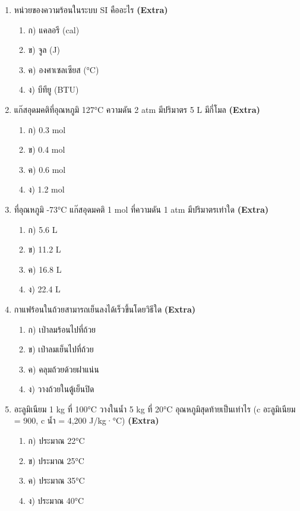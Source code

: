 \documentclass[12pt]{article}
\begin{document}
\begin{enumerate}[label=\arabic*.]
\begin{enumerate}[label=)]
\item ง) กระดาษดูดซับความร้อนไว้หมด
\end{enumerate}
\item หน่วยของความร้อนในระบบ SI คืออะไร \hfill \textbf{\small (Extra)}
\begin{enumerate}[label=)]
\item ก) แคลอรี (cal)
\item ข) จูล (J)
\item ค) องศาเซลเซียส (°C)
\item ง) บีทียู (BTU)
\end{enumerate}
\item แก๊สอุดมคติที่อุณหภูมิ 127°C ความดัน 2 atm มีปริมาตร 5 L มีกี่โมล \hfill \textbf{\small (Extra)}
\begin{enumerate}[label=)]
\item ก) 0.3 mol
\item ข) 0.4 mol
\item ค) 0.6 mol
\item ง) 1.2 mol
\end{enumerate}
\item ที่อุณหภูมิ -73°C แก๊สอุดมคติ 1 mol ที่ความดัน 1 atm มีปริมาตรเท่าใด \hfill \textbf{\small (Extra)}
\begin{enumerate}[label=)]
\item ก) 5.6 L
\item ข) 11.2 L
\item ค) 16.8 L
\item ง) 22.4 L
\end{enumerate}
\item กาแฟร้อนในถ้วยสามารถเย็นลงได้เร็วขึ้นโดยวิธีใด \hfill \textbf{\small (Extra)}
\begin{enumerate}[label=)]
\item ก) เป่าลมร้อนไปที่ถ้วย
\item ข) เป่าลมเย็นไปที่ถ้วย
\item ค) คลุมถ้วยด้วยฝาแน่น
\item ง) วางถ้วยในตู้เย็นปิด
\end{enumerate}
\item อะลูมิเนียม 1 kg ที่ 100°C วางในน้ำ 5 kg ที่ 20°C อุณหภูมิสุดท้ายเป็นเท่าไร (c อะลูมิเนียม = 900, c น้ำ = 4,200 J/kg·°C) \hfill \textbf{\small (Extra)}
\begin{enumerate}[label=)]
\item ก) ประมาณ 22°C
\item ข) ประมาณ 25°C
\item ค) ประมาณ 35°C
\item ง) ประมาณ 40°C

\end{enumerate}
\end{enumerate}
\end{document}
